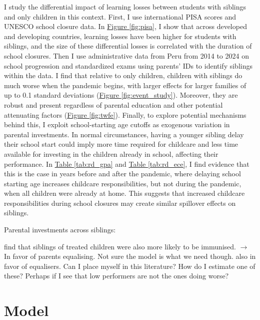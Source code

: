I study the differential impact of learning losses between students with siblings and only children in this context. First, I use international PISA scores and UNESCO school closure data. In \hyperref[fig:pisa]{Figure \ref{fig:pisa}}, I show that across developed and developing countries, learning losses have been higher for students with siblings, and the size of these differential losses is correlated with the duration of school closures. Then I use administrative data from Peru from 2014 to 2024 on school progression and standardized exams using parents' IDs to identify siblings within the data. I find that relative to only children, children with siblings do much worse when the pandemic begins, with larger effects for larger families of up to 0.1 standard deviations (\hyperref[fig:event_study]{Figure \ref{fig:event_study}}). Moreover, they are robust and present regardless of parental education and other potential attenuating factors (\hyperref[fig:twfe]{Figure \ref{fig:twfe}}). Finally, to explore potential mechanisms behind this, I exploit school-starting age cutoffs as exogenous variation in parental investments. In normal circumstances, having a younger sibling delay their school start could imply more time required for childcare and less time available for investing in the children already in school, affecting their performance. In \hyperref[tab:rd_gpa]{Table \ref{tab:rd_gpa}} and \hyperref[tab:rd_ece]{Table \ref{tab:rd_ece}}, I find evidence that this is the case in years before and after the pandemic, where delaying school starting age increases childcare responsibilities, but not during the pandemic, when all children were already at home. This suggests that increased childcare responsibilities during school closures may create similar spillover effects on siblings.


Parental investments across siblings:

\cite{adhvaryu_endowments_2016} find that siblings of treated children were also more likely to be immunised. $\rightarrow$ In favor of parents equalising. Not sure the model is what we need though. \cite{yi_early_2015} also in favor of equalisers. Can I place myself in this literature? How do I estimate one of these? Perhaps if I see that low performers are not the ones doing worse?

\section{Model}

